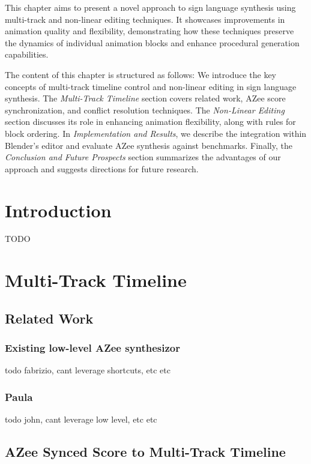 \documentclass[../../main.tex]{subfiles}
\begin{document}
This chapter aims to present a novel approach to sign language synthesis using multi-track and non-linear editing techniques. It showcases improvements in animation quality and flexibility, demonstrating how these techniques preserve the dynamics of individual animation blocks and enhance procedural generation capabilities.

The content of this chapter is structured as follows: We introduce the key concepts of multi-track timeline control and non-linear editing in sign language synthesis. The \emph{Multi-Track Timeline} section covers related work, AZee score synchronization, and conflict resolution techniques. The \emph{Non-Linear Editing} section discusses its role in enhancing animation flexibility, along with rules for block ordering. In \emph{Implementation and Results}, we describe the integration within Blender’s editor and evaluate AZee synthesis against benchmarks. Finally, the \emph{Conclusion and Future Prospects} section summarizes the advantages of our approach and suggests directions for future research.

\section{Introduction}

TODO


\section{Multi-Track Timeline}

\subsection{Related Work}

\subsubsection{Existing low-level AZee synthesizor}

todo fabrizio, cant leverage shortcuts, etc etc

\subsubsection{Paula}

todo john, cant leverage low level, etc etc

\subsection{AZee Synced Score to Multi-Track Timeline}
\end{document}
